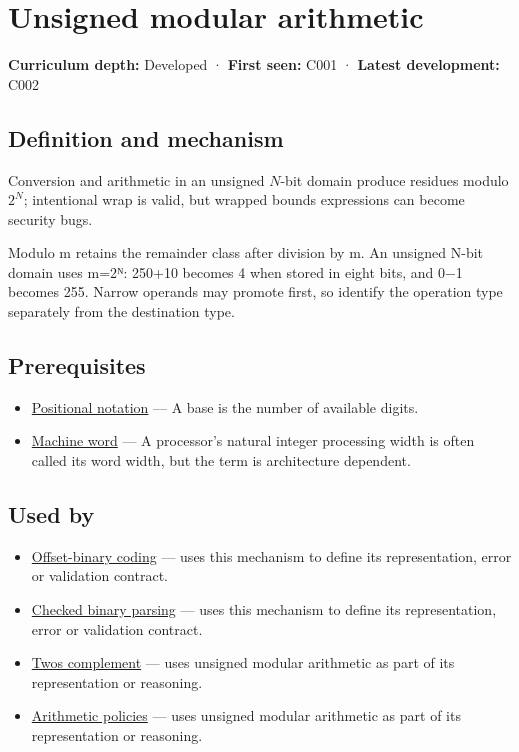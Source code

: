 \hypertarget{appendix-c99977d88b33}{}\label{referencestart:appendix-c99977d88b33}
\section{Unsigned modular arithmetic}\label{appendix-c99977d88b33-unsigned-modular-arithmetic}

\textbf{Curriculum depth:} Developed · \textbf{First seen:} C001 · \textbf{Latest development:} C002

\subsection{Definition and mechanism}\label{appendix-c99977d88b33-definition-and-mechanism}

Conversion and arithmetic in an unsigned \(N\)-bit domain produce residues modulo \(2^N\); intentional wrap is valid, but wrapped bounds expressions can become security bugs.

Modulo m retains the remainder class after division by m. An unsigned N-bit domain uses m=2ᴺ: 250+10 becomes 4 when stored in eight bits, and 0−1 becomes 255. Narrow operands may promote first, so identify the operation type separately from the destination type.

\subsection{Prerequisites}\label{appendix-c99977d88b33-prerequisites}

\begin{itemize}
\tightlist
\item
  \hyperref[appendix-83c3f28f7bda]{Positional notation} --- A base is the number of available digits.
\item
  \hyperref[appendix-d67a19507dc5]{Machine word} --- A processor's natural integer processing width is often called its word width, but the term is architecture dependent.
\end{itemize}

\subsection{Used by}\label{appendix-c99977d88b33-used-by}

\begin{itemize}
\item
  \hyperref[appendix-53a8cfb25f8d]{Offset-binary coding} --- uses this mechanism to define its representation, error or validation contract.
\item
  \hyperref[appendix-652d81568de9]{Checked binary parsing} --- uses this mechanism to define its representation, error or validation contract.
\item
  \hyperref[appendix-4fbc03d20829]{Two\textquotesingle s complement} --- uses unsigned modular arithmetic as part of its representation or reasoning.
\item
  \hyperref[appendix-2ed044358b82]{Arithmetic policies} --- uses unsigned modular arithmetic as part of its representation or reasoning.
\end{itemize}


